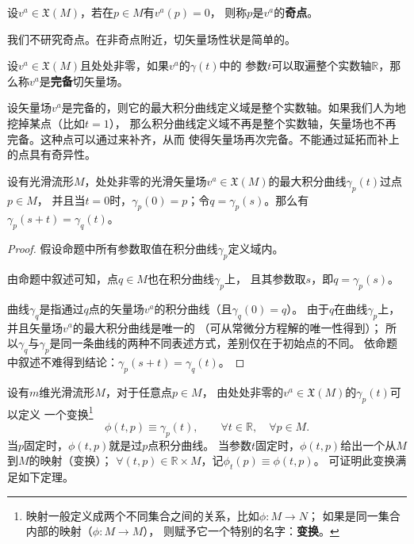 \begin{definition}
    设$v^a \in \mathfrak{X}(M)$，若在$p\in M$有$v^a(p)=0$，
    则称$p$是$v^a$的\textbf{奇点}。
\end{definition}
我们不研究奇点。在非奇点附近，切矢量场性状是简单的。


\begin{definition}\label{chdm:def_vector-complete}
    设$v^a \in \mathfrak{X}(M)$且处处非零，如果$v^a$的$\gamma(t)$中的
    参数$t$可以取遍整个实数轴$\mathbb{R}$，那么称$v^a$是\textbf{完备}切矢量场。
\end{definition}

设矢量场$v^a$是完备的，则它的最大积分曲线定义域是整个实数轴。如果我们人为地挖掉某点（比如$t=1$），
那么积分曲线定义域不再是整个实数轴，矢量场也不再完备。这种点可以通过来补齐，从而
使得矢量场再次完备。不能通过延拓而补上的点具有奇异性。

\begin{proposition}\label{chdm:thm_st}
    设有光滑流形$M$，处处非零的光滑矢量场$v^a\in \mathfrak{X}(M)$的最大积分曲线$\gamma_p(t)$过点$p \in M$，
    并且当$t=0$时，$\gamma_p(0)=p$；令$q=\gamma_p(s)$。那么有$\gamma_p(s+t)=\gamma_q(t)$。
\end{proposition}
\begin{proof}
    假设命题中所有参数取值在积分曲线$\gamma_p$定义域内。
    
    由命题中叙述可知，点$q\in M$也在积分曲线$\gamma_p$上，
    且其参数取$s$，即$q=\gamma_p(s)$。
    
    曲线$\gamma_q$是指通过$q$点的矢量场$v^a$的积分曲线（且$\gamma_q(0)=q$）。
    由于$q$在曲线$\gamma_p$上，并且矢量场$v^a$的最大积分曲线是唯一的
    （可从常微分方程解的唯一性得到）；
    所以$\gamma_q$与$\gamma_p$是同一条曲线的两种不同表述方式，差别仅在于初始点的不同。
    依命题中叙述不难得到结论：$\gamma_p(s+t)=\gamma_q(t)$。
\end{proof}

设有$m$维光滑流形$M$，对于任意点$p \in M$，
由处处非零的$v^a\in \mathfrak{X}(M)$的$\gamma_p(t)$可以定义
一个变换{\footnote{映射一般定义成两个不同集合之间的关系，比如$\phi:M\to N$；
        如果是同一集合内部的映射（$\phi:M\to M$），
        则赋予它一个特别的名字：\textbf{变换}。}}
\begin{equation}\label{chdm:eqn_tmp-gammap}
    \phi(t,p)\equiv \gamma_p(t), \qquad \forall t\in \mathbb{R},\quad \forall p\in M .
\end{equation}
当$p$固定时，$\phi(t,p)$就是过$p$点积分曲线。
当参数$t$固定时，$\phi(t,p)$给出一个从$M$到$M$的映射（变换）；
$\forall(t,p )\in\mathbb{R}\times M$，记$\phi_t(p)\equiv \phi(t,p)$。
可证明此变换满足如下定理。


